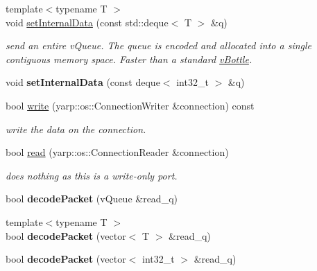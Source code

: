 \begin{DoxyCompactItemize}
\mbox{\label{classev_1_1vPortableInterface_aabd7db2eee7f3d39fe6e87023fc39ed2}} 
{\footnotesize template$<$typename T $>$ }\\void \hyperlink{classev_1_1vPortableInterface_aabd7db2eee7f3d39fe6e87023fc39ed2}{set\+Internal\+Data} (const std\+::deque$<$ T $>$ \&q)
\begin{DoxyCompactList}\small\item\em send an entire v\+Queue. The queue is encoded and allocated into a single contiguous memory space. Faster than a standard \hyperlink{classev_1_1vBottle}{v\+Bottle}. \end{DoxyCompactList}\item 
\mbox{\label{classev_1_1vPortableInterface_a1483ddacc49ebce50fa482cb87227ce5}} 
void {\bfseries set\+Internal\+Data} (const deque$<$ int32\+\_\+t $>$ \&q)
\item 
\mbox{\label{classev_1_1vPortableInterface_aef6ef668c89f85168f34c7e0c05a6ced}} 
bool \hyperlink{classev_1_1vPortableInterface_aef6ef668c89f85168f34c7e0c05a6ced}{write} (yarp\+::os\+::\+Connection\+Writer \&connection) const
\begin{DoxyCompactList}\small\item\em write the data on the connection. \end{DoxyCompactList}\item 
\mbox{\label{classev_1_1vPortableInterface_ab402795dcf4ab5ca872b5a099197a2e4}} 
bool \hyperlink{classev_1_1vPortableInterface_ab402795dcf4ab5ca872b5a099197a2e4}{read} (yarp\+::os\+::\+Connection\+Reader \&connection)
\begin{DoxyCompactList}\small\item\em does nothing as this is a write-\/only port. \end{DoxyCompactList}\item 
\mbox{\label{classev_1_1vPortableInterface_ac7cd04f6a05e64ec4abe1f9322437315}} 
bool {\bfseries decode\+Packet} (v\+Queue \&read\+\_\+q)
\item 
\mbox{\label{classev_1_1vPortableInterface_abe80d47ae0323e6245b0e7a2aa0aac78}} 
{\footnotesize template$<$typename T $>$ }\\bool {\bfseries decode\+Packet} (vector$<$ T $>$ \&read\+\_\+q)
\item 
\mbox{\label{classev_1_1vPortableInterface_acac49767e0f87e2be5185d373f629097}} 
bool {\bfseries decode\+Packet} (vector$<$ int32\+\_\+t $>$ \&read\+\_\+q)
\end{DoxyCompactItemize}
